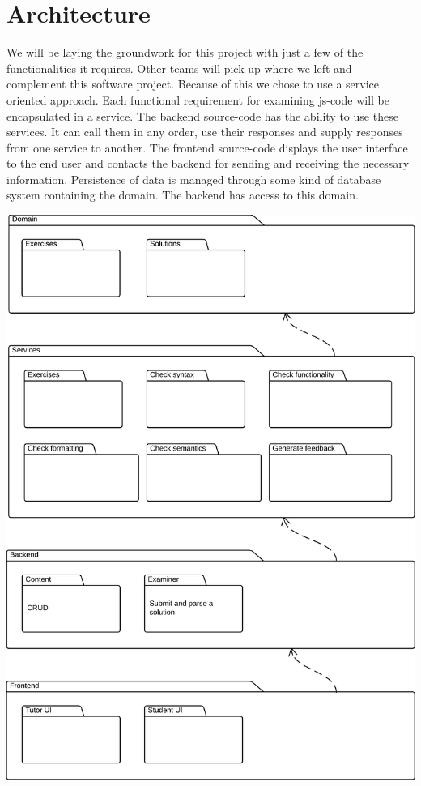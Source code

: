 \section{Architecture}
We will be laying the groundwork for this project
with just a few of the functionalities it requires.
Other teams will pick up where we left and complement this software project.
Because of this we chose to use a service oriented approach.
Each functional requirement for examining \gls{js-code}
will be encapsulated in a service.
The backend \gls{source-code} has the ability to use these services.
It can call them in any order, use their responses
and supply responses from one service to another.
The frontend \gls{source-code} displays the user interface to the end user
and contacts the backend for sending and receiving the necessary information.
Persistence of data is managed through some kind of database system
containing the domain.
The backend has access to this domain.

\includegraphics[scale=0.55] {diagrams-images/architecture}

